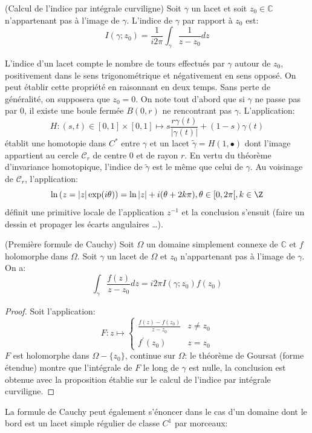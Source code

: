 \begin{fdefn}(Calcul de l'indice par intégrale curviligne)
Soit $\gamma$ un lacet et  soit $z_0 \in \mathbb{C}$ n'appartenant pas à l'image
de $\gamma$. L'indice de $\gamma$ par rapport à $z_0$ est:
\[
I(\gamma;z_0) = \frac{1}{i 2 \pi}\int_{\gamma} \frac{1}{z-z_0}dz
\]
\end{fdefn}
L'indice d'un lacet compte le nombre de tours effectués par $\gamma$ autour de $z_0$, positivement dans le sens trigonométrique et négativement en sens opposé. On peut établir cette propriété en raisonnant en deux temps. Sans perte de généralité, on supposera que $z_0 = 0$. On note tout d'abord que si $\gamma$ ne passe pas par 0, il existe une boule fermée $B(0,r)$ ne rencontrant pas $\gamma$. L'application:
\[
H \colon (s,t) \in [0,1] \times [0,1] \mapsto s \frac{r \gamma(t)}{|\gamma(t)|} + (1-s) \gamma(t)
\] 
établit une homotopie dans $C^*$ entre $\gamma$ et un lacet $\tilde{\gamma} = H(1,\bullet)$ dont l'image appartient au cercle $\mathcal{C}_r$ de centre 0 et de rayon $r$. En vertu du théorème d'invariance homotopique, l'indice de $\tilde{\gamma}$ est le même que celui de $\gamma$. Au voisinage de $\mathcal{C}_r$, l'application:
\[
\ln \left(z = |z|\exp(i \theta) \right) = \ln |z| + i (\theta+ 2 k \pi), \theta \in [0, 2 \pi [ , k \in \Z
\]
définit une primitive locale de l'application $z^{-1}$ et la conclusion s'ensuit (faire un dessin et propager les écarts angulaires \dots). 
\begin{fthm}(Première formule de Cauchy)
Soit $\Omega$ un domaine simplement connexe de $\mathbb{C}$ et $f$ holomorphe
dans $\Omega$. Soit $\gamma$ un lacet de $\Omega$ et $z_0$ n'appartenant pas à
l'image de $\gamma$. On a:
\[
\int_{\gamma} \frac{f(z)}{z-z_0} dz = i 2 \pi I(\gamma; z_0)f(z_0)
\]
\end{fthm}
\begin{proof}
Soit l'application:
\[
F \colon z \mapsto \left \{
\begin{array}{cc} 
\frac{f(z)-f(z_0)}{z-z_0} & z \neq z_0 \\
f^\prime(z_0) & z = z_0
\end{array}
\right.
\]
$F$ est holomorphe dans $\Omega - \{z_0\}$, continue sur $\Omega$: le théorème
de Goursat (forme étendue) montre que l'intégrale de $F$ le long de $\gamma$ est
nulle, la conclusion est obtenue avec la proposition établie sur le calcul de
l'indice par intégrale curviligne.
\end{proof}
La formule de Cauchy peut également s'énoncer dans le cas d'un domaine dont le
bord est un lacet simple régulier de classe $C^1$ par morceaux:

